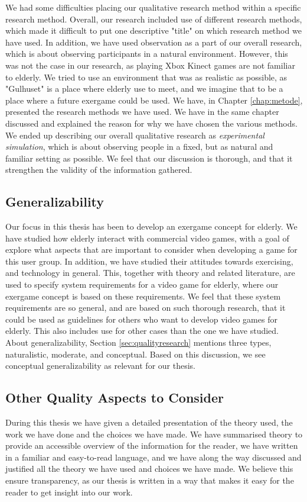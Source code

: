 We had some difficulties placing our qualitative research method within a specific research method. Overall, our research included use of different research methods, which made it difficult to put one descriptive "title" on which research method we have used. In addition, we have used observation as a part of our overall research, which is about observing participants in a natural environment. However, this was not the case in our research, as playing Xbox Kinect games are not familiar to elderly. We tried to use an environment that was as realistic as possible, as "Gulhuset" is a place where elderly use to meet, and we imagine that to be a place where a future exergame could be used. We have, in Chapter \ref{chap:metode}, presented the research methods we have used. We have in the same chapter discussed and explained the reason for why we have chosen the various methods. We ended up describing our overall qualitative research as \emph{experimental simulation}, which is about observing people in a fixed, but as natural and familiar setting as possible. We feel that our discussion is thorough, and that it strengthen the validity of the information gathered. 
    
\subsection{Generalizability}    
Our focus in this thesis has been to develop an exergame concept for elderly. We have studied how elderly interact with commercial video games, with a goal of explore what aspects that are important to consider when developing a game for this user group. In addition, we have studied their attitudes towards exercising, and technology in general. This, together with theory and related literature, are used to specify system requirements for a video game for elderly, where our exergame concept is based on these requirements. We feel that these system requirements are so general, and are based on such thorough research, that it could be used as guidelines for others who want to develop video games for elderly. This also includes use for other cases than the one we have studied. About generalizability, Section \ref{sec:qualityresearch} mentions three types, naturalistic, moderate, and conceptual. Based on this discussion, we see conceptual generalizability as relevant for our thesis.    


\subsection{Other Quality Aspects to Consider}
During this thesis we have given a detailed presentation of the theory used, the work we have done and the choices we have made. We have summarised theory to provide an accessible overview of the information for the reader, we have written in a familiar and easy-to-read language, and we have along the way discussed and justified all the theory we have used and choices we have made. We believe this ensure transparency, as our thesis is written in a way that makes it easy for the reader to get insight into our work. 


